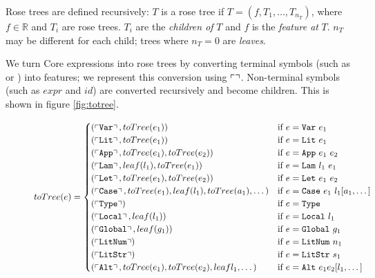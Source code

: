 Rose trees are defined recursively: $T$ is a rose tree if $T = (f, T_1, \dots, T_{n_T})$, where $f \in \mathbb{R}$ and $T_i$ are rose trees. $T_i$ are the \emph{children of} $T$ and $f$ is the \emph{feature at} $T$. $n_T$ may be different for each child; trees where $n_T = 0$ are \emph{leaves}.

We turn Core expressions into rose trees by converting terminal symbols (such as  or ) into features; we represent this conversion using $\left\ulcorner  \right\urcorner$. Non-terminal symbols (such as $expr$ and $id$) are converted recursively and become children. This is shown in figure \ref{fig:totree}.

\begin{figure}
  \begin{align*}
    toTree(e) &=
    \begin{cases}
      (\feature{\CVar}, toTree(e_1))                                 & \text{if $e = \CVar\ e_1$} \\
      (\feature{\CLit}, toTree(e_1))                                 & \text{if $e = \CLit\ e_1$} \\
      (\feature{\CApp}, toTree(e_1), toTree(e_2))                    & \text{if $e = \CApp\ e_1\ e_2$} \\
      (\feature{\CLam}, leaf(l_1), toTree(e_1))                      & \text{if $e = \CLam\ l_1\ e_1$} \\
      (\feature{\CLet}, toTree(e_1), toTree(e_2))                    & \text{if $e = \CLet\ e_1\ e_2$} \\
      (\feature{\CCase}, toTree(e_1), leaf(l_1), toTree(a_1), \dots) & \text{if $e = \CCase\ e_1\ l_1 [a_1, \dots]$} \\
      (\feature{\CType})                                            & \text{if $e = \CType$} \\
      (\feature{\CLocal}, leaf(l_1))                                & \text{if $e = \CLocal\ l_1$} \\
      (\feature{\CGlobal}, leaf(g_1))                               & \text{if $e = \CGlobal\ g_1$} \\
      (\feature{\CLitNum})                                          & \text{if $e = \CLitNum\ n_1$} \\
      (\feature{\CLitStr})                                          & \text{if $e = \CLitStr\ s_1$} \\
      (\feature{\CAlt}, toTree(e_1), toTree(e_2), leaf{l_1}, \dots)  & \text{if $e = \CAlt\ e_1 e_2 [l_1, \dots]$}  \\

\end{cases}
\end{align*}
\end{figure}
